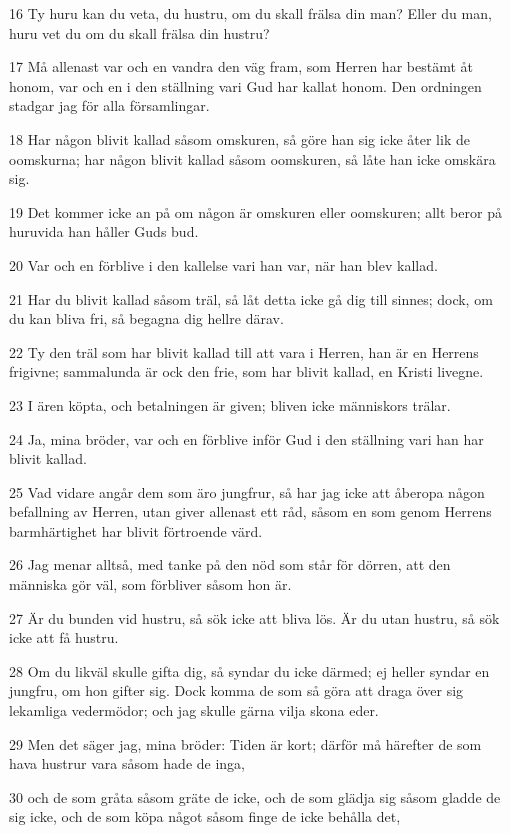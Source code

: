 \par 16 Ty huru kan du veta, du hustru, om du skall frälsa din man? Eller du man, huru vet du om du skall frälsa din hustru?
\par 17 Må allenast var och en vandra den väg fram, som Herren har bestämt åt honom, var och en i den ställning vari Gud har kallat honom. Den ordningen stadgar jag för alla församlingar.
\par 18 Har någon blivit kallad såsom omskuren, så göre han sig icke åter lik de oomskurna; har någon blivit kallad såsom oomskuren, så låte han icke omskära sig.
\par 19 Det kommer icke an på om någon är omskuren eller oomskuren; allt beror på huruvida han håller Guds bud.
\par 20 Var och en förblive i den kallelse vari han var, när han blev kallad.
\par 21 Har du blivit kallad såsom träl, så låt detta icke gå dig till sinnes; dock, om du kan bliva fri, så begagna dig hellre därav.
\par 22 Ty den träl som har blivit kallad till att vara i Herren, han är en Herrens frigivne; sammalunda är ock den frie, som har blivit kallad, en Kristi livegne.
\par 23 I ären köpta, och betalningen är given; bliven icke människors trälar.
\par 24 Ja, mina bröder, var och en förblive inför Gud i den ställning vari han har blivit kallad.
\par 25 Vad vidare angår dem som äro jungfrur, så har jag icke att åberopa någon befallning av Herren, utan giver allenast ett råd, såsom en som genom Herrens barmhärtighet har blivit förtroende värd.
\par 26 Jag menar alltså, med tanke på den nöd som står för dörren, att den människa gör väl, som förbliver såsom hon är.
\par 27 Är du bunden vid hustru, så sök icke att bliva lös. Är du utan hustru, så sök icke att få hustru.
\par 28 Om du likväl skulle gifta dig, så syndar du icke därmed; ej heller syndar en jungfru, om hon gifter sig. Dock komma de som så göra att draga över sig lekamliga vedermödor; och jag skulle gärna vilja skona eder.
\par 29 Men det säger jag, mina bröder: Tiden är kort; därför må härefter de som hava hustrur vara såsom hade de inga,
\par 30 och de som gråta såsom gräte de icke, och de som glädja sig såsom gladde de sig icke, och de som köpa något såsom finge de icke behålla det,
